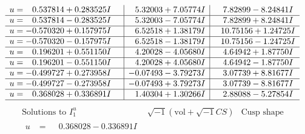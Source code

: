 \documentclass[1p]{elsarticle_modified}
\theoremstyle{definition}
\newcommand{\I}{\sqrt{-1}}
\begin{document}
$$\begin{array}{c|c|c}
\begin{aligned}
u &= \phantom{-}0.537814 + 0.283525 I\end{aligned}
 & \phantom{-}5.32003 + 7.05774 I & \phantom{-}7.82899 - 8.24841 I \\ \hline\begin{aligned}
u &= \phantom{-}0.537814 - 0.283525 I\end{aligned}
 & \phantom{-}5.32003 - 7.05774 I & \phantom{-}7.82899 + 8.24841 I \\ \hline\begin{aligned}
u &= -0.570320 + 0.157975 I\end{aligned}
 & \phantom{-}6.52518 + 1.38179 I & \phantom{-}10.75156 + 1.24725 I \\ \hline\begin{aligned}
u &= -0.570320 - 0.157975 I\end{aligned}
 & \phantom{-}6.52518 - 1.38179 I & \phantom{-}10.75156 - 1.24725 I \\ \hline\begin{aligned}
u &= \phantom{-}0.196201 + 0.551150 I\end{aligned}
 & \phantom{-}4.20028 - 4.05680 I & \phantom{-}4.64942 + 1.87750 I \\ \hline\begin{aligned}
u &= \phantom{-}0.196201 - 0.551150 I\end{aligned}
 & \phantom{-}4.20028 + 4.05680 I & \phantom{-}4.64942 - 1.87750 I \\ \hline\begin{aligned}
u &= -0.499727 + 0.273958 I\end{aligned}
 & -0.07493 - 3.79273 I & \phantom{-}3.07739 + 8.81677 I \\ \hline\begin{aligned}
u &= -0.499727 - 0.273958 I\end{aligned}
 & -0.07493 + 3.79273 I & \phantom{-}3.07739 - 8.81677 I \\ \hline\begin{aligned}
u &= \phantom{-}0.368028 + 0.336891 I\end{aligned}
 & \phantom{-}1.40304 + 1.30266 I & \phantom{-}2.88088 - 5.27854 I\\
 \hline 
 \end{array}$$\newpage$$\begin{array}{c|c|c}  
\text{Solutions to }I^u_{1}& \I (\text{vol} + \sqrt{-1}CS) & \text{Cusp shape}\\
 \hline 
\begin{aligned}
u &= \phantom{-}0.368028 - 0.336891 I\end{aligned}

\end{array}$$
\end{document}

